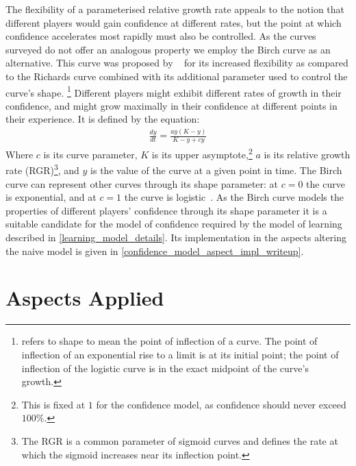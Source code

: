 The flexibility of a parameterised relative growth rate appeals to the notion
that different players would gain confidence at different rates, but the point
at which confidence accelerates most rapidly must also be controlled. As the curves
surveyed do not offer an analogous property we employ
the Birch curve as an alternative. This curve was proposed by \citeauthor{birch1999new}~\cite{birch1999new} for
its increased flexibility as compared to the Richards curve combined with its
additional parameter used to control the curve's shape.
\footnote{\citet{birch1999new} refers to shape to mean the point of
inflection of a curve. The point of inflection of an exponential rise to a limit
is at its initial point; the point of inflection of the logistic curve is in the
exact midpoint of the curve's growth.} Different players might exhibit different
rates of growth in their confidence, and might grow maximally in their
confidence at different points in their experience. It is defined by the
equation:
\begin{align*}
\frac{dy}{dt} = \frac{ay(K-y)}{K-y+cy}
\end{align*}
Where $c$ is its curve parameter, $K$ is its upper asymptote,\footnote{This is
fixed at $1$ for the confidence model, as confidence should never exceed
$100\%$.} $a$ is its relative growth rate (RGR)\footnote{The RGR is a common
parameter of sigmoid curves and defines the rate at which the sigmoid increases
near its inflection point.}, and $y$ is the value of the curve at a given point
in time. The Birch curve can represent other curves through its shape parameter:
at $c=0$ the curve is exponential, and at $c=1$ the curve is
logistic~\cite{birch1999new}. As the Birch curve models the properties of
different players' confidence through its shape parameter it is a suitable
candidate for the model of confidence required by the model of learning
described in \cref{learning_model_details}. Its implementation in the aspects
altering the naive model is given in
\cref{confidence_model_aspect_impl_writeup}.


\section{Aspects Applied}
\label{sec:optimisation_with_aspects_aspectsdeveloped}
\label{aspects_applied_section}




